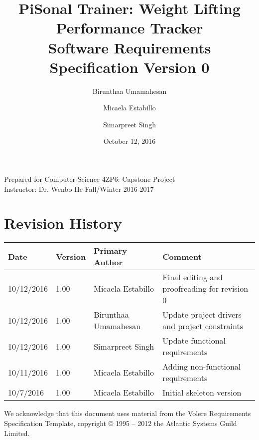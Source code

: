 \documentclass{article}
\title{
PiSonal Trainer: Weight Lifting Performance Tracker\\
\Large {Software Requirements Specification Version 0}
}
\date{October 12, 2016}
\author{Birunthaa Umamahesan \and Micaela Estabillo \and Simarpreet Singh}
\begin{document}
\thispagestyle{plain}
\maketitle
\vfill
\begin{center}
    Prepared for Computer Science 4ZP6: Capstone Project \\
    Instructor: Dr. Wenbo He
    Fall/Winter 2016-2017\\
\end{center}
\newpage

\tableofcontents

\listoffigures

\listoftables

\thispagestyle{plain}

\newpage

\section*{Revision History}
\begingroup
\begin{tabular}{ | p{2cm} | p{1.5cm} | p{3.8cm} | p{7cm} |} 
    \hline
    \textbf{Date} & \textbf{Version} & \textbf{Primary Author} & \textbf{Comment}\\
    \hline
    10/12/2016 & 1.00 & Micaela Estabillo & Final editing and proofreading for revision 0\\ 
    \hline
    10/12/2016 & 1.00 & Birunthaa Umamahesan & Update project drivers and project constraints \\
    \hline
    10/12/2016 & 1.00 & Simarpreet Singh & Update functional requirements\\ 
    \hline
    10/11/2016 & 1.00 & Micaela Estabillo & Adding non-functional requirements\\
    \hline
    10/7/2016 & 1.00 & Micaela Estabillo & Initial skeleton version\\
    \hline
\end{tabular}
\endgroup


\begin{center}
We acknowledge that this document uses material from the Volere Requirements Specification Template, copyright © 1995 – 2012 the Atlantic Systems Guild Limited.
\end{center}
\end{document}
